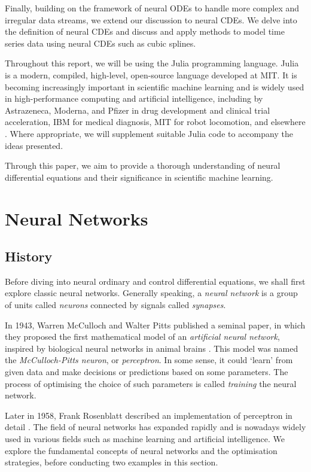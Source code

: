 \documentclass[a4paper,11pt,titlepage]{article}
\theoremstyle{definition}
\theoremstyle{plain}
\theoremstyle{remark}
\begin{document}
Finally, building on the framework of neural ODEs to handle more complex and irregular data streams, we extend our discussion to neural CDEs. We delve into the definition of neural CDEs and discuss and apply methods to model time series data using neural CDEs such as cubic splines.

Throughout this report, we will be using the Julia programming language. Julia is a modern, compiled, high-level, open-source language developed at MIT. It is becoming increasingly important in scientific machine learning and is widely used in high-performance computing and artificial intelligence, including by Astrazeneca, Moderna, and Pfizer in drug development and clinical trial acceleration, IBM for medical diagnosis, MIT for robot locomotion, and elsewhere \cite{SciMLSANUM2024}. Where appropriate, we will supplement suitable Julia code to accompany the ideas presented.

Through this paper, we aim to provide a thorough understanding of neural differential equations and their significance in scientific machine learning.

\pagebreak
\section{Neural Networks}
\label{sec:neuralnetworks}
\subsection{History}

Before diving into neural ordinary and control differential equations, we shall first explore classic neural networks. Generally speaking, a \textit{neural network} is a group of units called \textit{neurons} connected by signals called \textit{synapses}.

In 1943, Warren McCulloch and Walter Pitts published a seminal paper, in which they proposed the first mathematical model of an \textit{artificial neural network}, inspired by biological neural networks in animal brains \cite{McCulloch1943}. This model was named the \textit{McCulloch-Pitts neuron}, or \textit{perceptron}. In some sense, it could ‘learn’ from given data and make decisions or predictions based on some parameters. The process of optimising the choice of such parameters is called \textit{training} the neural network.

Later in 1958, Frank Rosenblatt described an implementation of perceptron in detail \cite{Rosenblatt1958}. The field of neural networks has expanded rapidly and is nowadays widely used in various fields such as machine learning and artificial intelligence. We explore the fundamental concepts of neural networks and the optimisation strategies, before conducting two examples in this section.
\end{document}
